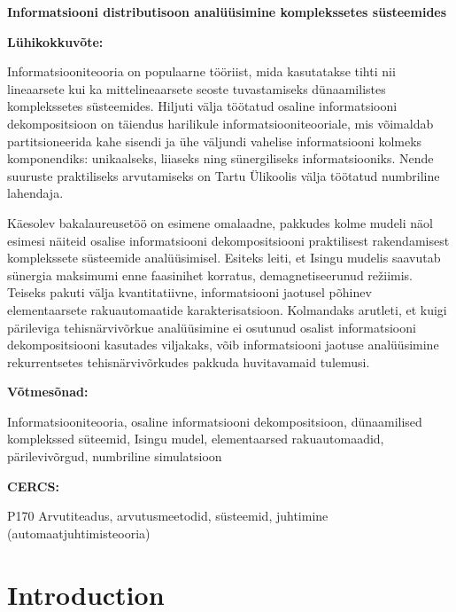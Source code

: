 \documentclass[12pt]{article}
\begin{document}
\noindent\textbf{\large Informatsiooni distributisoon analüüsimine komplekssetes süsteemides}

\vspace*{3ex}


\noindent\textbf{Lühikokkuvõte:} 

\noindent
Informatsiooniteooria on populaarne tööriist, mida kasutatakse tihti nii lineaarsete kui ka mittelineaarsete seoste tuvastamiseks dünaamilistes komplekssetes süsteemides. Hiljuti välja töötatud osaline informatsiooni dekompositsioon on täiendus harilikule informatsiooniteooriale, mis võimaldab partitsioneerida kahe sisendi ja ühe väljundi vahelise informatsiooni kolmeks komponendiks: unikaalseks, liiaseks ning sünergiliseks informatsiooniks. Nende suuruste praktiliseks arvutamiseks on Tartu Ülikoolis välja töötatud numbriline lahendaja. 

Käesolev bakalaureusetöö on esimene omalaadne, pakkudes kolme mudeli näol esimesi näiteid osalise informatsiooni dekompositsiooni praktilisest rakendamisest komplekssete süsteemide analüüsimisel. Esiteks leiti, et Isingu mudelis saavutab sünergia maksimumi enne faasinihet korratus, demagnetiseerunud režiimis. Teiseks pakuti välja kvantitatiivne, informatsiooni jaotusel põhinev elementaarsete rakuautomaatide karakterisatsioon. Kolmandaks arutleti, et kuigi pärileviga tehisnärvivõrkue analüüsimine ei osutunud osalist informatsiooni dekompositsiooni kasutades viljakaks, võib informatsiooni jaotuse analüüsimine rekurrentsetes tehisnärvivõrkudes pakkuda huvitavamaid tulemusi.

\vspace*{1ex}

\noindent\textbf{Võtmesõnad:} 

Informatsiooniteooria, osaline informatsiooni dekompositsioon, dünaamilised komplekssed süteemid, 
Isingu mudel, elementaarsed rakuautomaadid, pärilevivõrgud, numbriline simulatsioon

\vspace*{1ex}

\noindent\textbf{CERCS:} 

P170 Arvutiteadus, arvutusmeetodid, süsteemid, juhtimine (automaatjuhtimisteooria)

\newpage
\tableofcontents

\newpage
\section*{Introduction}
\end{document}
